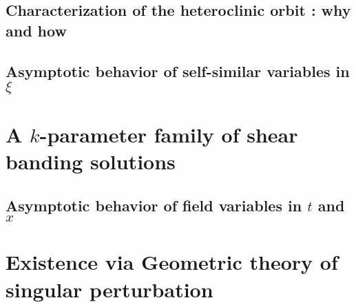 \documentclass[a4paper,11pt]{article}
\begin{document}
\subsection{Characterization of the heteroclinic orbit : why and how}
\subsection{Asymptotic behavior of self-similar variables in $\xi$}
\section{A $k$-parameter family of shear banding solutions}
\subsection{Asymptotic behavior of field variables in $t$ and $x$}
\section{Existence via Geometric theory of singular perturbation}
\end{document}
